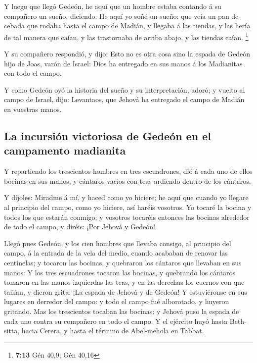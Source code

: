  Y luego que llegó Gedeón, he aquí que un hombre estaba
contando á su compañero un sueño, diciendo: He aquí yo soñé un sueño:
que veía un pan de cebada que rodaba hasta el campo de Madián, y llegaba
á las tiendas, y las hería de tal manera que caían, y las trastornaba de
arriba abajo, y las tiendas caían. \footnote{\textbf{7:13} Gén 40,9; Gén
  40,16}

 Y su compañero respondió, y dijo: Esto no es otra cosa
sino la espada de Gedeón hijo de Joas, varón de Israel: Dios ha
entregado en sus manos á los Madianitas con todo el campo.

 Y como Gedeón oyó la historia del sueño y su
interpretación, adoró; y vuelto al campo de Israel, dijo: Levantaos, que
Jehová ha entregado el campo de Madián en vuestras manos.

\hypertarget{la-incursiuxf3n-victoriosa-de-gedeuxf3n-en-el-campamento-madianita}{%
\subsection{La incursión victoriosa de Gedeón en el campamento
madianita}\label{la-incursiuxf3n-victoriosa-de-gedeuxf3n-en-el-campamento-madianita}}

 Y repartiendo los trescientos hombres en tres escuadrones,
dió á cada uno de ellos bocinas en sus manos, y cántaros vacíos con teas
ardiendo dentro de los cántaros.

 Y díjoles: Miradme á mí, y haced como yo hiciere; he aquí
que cuando yo llegare al principio del campo, como yo hiciere, así
haréis vosotros.  Yo tocaré la bocina y todos los que
estarán conmigo; y vosotros tocaréis entonces las bocinas alrededor de
todo el campo, y diréis: ¡Por Jehová y Gedeón!

 Llegó pues Gedeón, y los cien hombres que llevaba consigo,
al principio del campo, á la entrada de la vela del medio, cuando
acababan de renovar las centinelas; y tocaron las bocinas, y quebraron
los cántaros que llevaban en sus manos:  Y los tres
escuadrones tocaron las bocinas, y quebrando los cántaros tomaron en las
manos izquierdas las teas, y en las derechas los cuernos con que tañían,
y dieron grita: ¡La espada de Jehová y de Gedeón!  Y
estuviéronse en sus lugares en derredor del campo: y todo el campo fué
alborotado, y huyeron gritando.  Mas los trescientos
tocaban las bocinas: y Jehová puso la espada de cada uno contra su
compañero en todo el campo. Y el ejército huyó hasta Beth-sitta, hacia
Cerera, y hasta el término de Abel-mehola en Tabbat.

